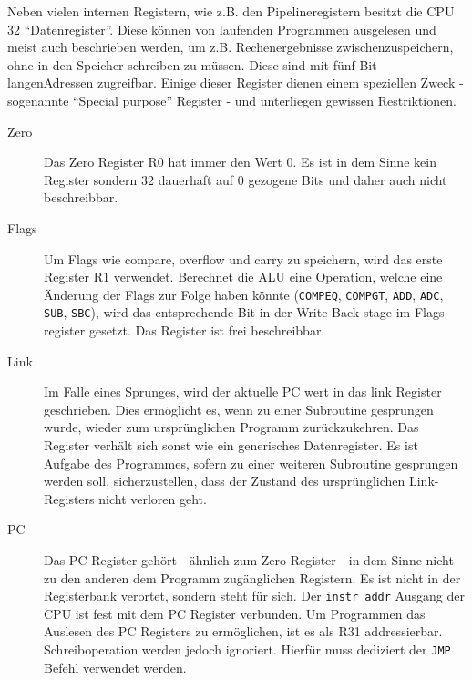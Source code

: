 \documentclass[paper=a4,fontsize=12pt,twocolumn]{scrreprt}
\begin{document}
Neben vielen internen Registern, wie z.B. den Pipelineregistern besitzt die CPU 32 \enquote{Datenregister}.
Diese können von laufenden Programmen ausgelesen und meist auch beschrieben werden, um z.B. Rechenergebnisse zwischenzuspeichern, ohne in den Speicher schreiben zu müssen. 
Diese sind mit fünf Bit langen\footnotemark Adressen zugreifbar.
Einige dieser Register dienen einem speziellen Zweck - sogenannte \enquote{Special purpose} Register - und unterliegen gewissen Restriktionen.
\begin{description}
    \item[Zero]
        Das Zero Register R0 hat immer den Wert $0$.
        Es ist in dem Sinne kein Register sondern 32 dauerhaft auf 0 gezogene Bits und daher auch nicht beschreibbar.
    \item[Flags]
        Um Flags wie compare, overflow und carry zu speichern, wird das erste Register R1 verwendet.
        Berechnet die ALU eine Operation, welche eine Änderung der Flags zur Folge haben könnte (\texttt{COMPEQ}, \texttt{COMPGT}, \texttt{ADD}, \texttt{ADC}, \texttt{SUB}, \texttt{SBC}), wird das entsprechende Bit in der Write Back stage im Flags register gesetzt.
        Das Register ist frei beschreibbar.
    \item[Link]
        Im Falle eines Sprunges, wird der aktuelle PC wert in das link Register geschrieben.
        Dies ermöglicht es, wenn zu einer Subroutine gesprungen wurde, wieder zum ursprünglichen Programm zurückzukehren.
        Das Register verhält sich sonst wie ein generisches Datenregister.
        Es ist Aufgabe des Programmes, sofern zu einer weiteren Subroutine gesprungen werden soll, sicherzustellen, dass der Zustand des ursprünglichen Link-Registers nicht verloren geht.
    \item[PC]
        Das PC Register gehört - ähnlich zum Zero-Register - in dem Sinne nicht zu den anderen dem Programm zugänglichen Registern.
        Es ist nicht in der Registerbank verortet, sondern steht für sich.
        Der \texttt{instr\_addr} Ausgang der CPU ist fest mit dem PC Register verbunden.
        Um Programmen das Auslesen des PC Registers zu ermöglichen, ist es als R31 addressierbar. Schreiboperation werden jedoch ignoriert.
        Hierfür muss dediziert der \texttt{JMP} Befehl verwendet werden.
\end{description}
\end{document}
